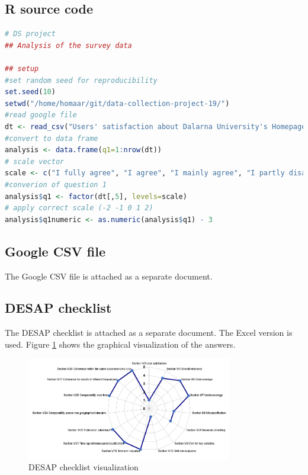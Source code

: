 \documentclass[12pt,a4paper,paper=a4,oneside,titlepage,pdftex]{scrartcl}
\begin{document}
\newpage
\subsection{R source code}
\begin{lstlisting}[caption={Data Import into R and first analysis steps},label={lst:r-import},language=R]
# DS project
## Analysis of the survey data

## setup
#set random seed for reproducibility
set.seed(10)
setwd("/home/homaar/git/data-collection-project-19/")
#read google file
dt <- read_csv("Users' satisfaction about Dalarna University's Homepage.csv")
#convert to data frame
analysis <- data.frame(q1=1:nrow(dt))
# scale vector
scale <- c("I fully agree", "I agree", "I mainly agree", "I partly disagree", "I disagree")
#converion of question 1
analysis$q1 <- factor(dt[,5], levels=scale)
# apply correct scale (-2 -1 0 1 2)
analysis$q1numeric <- as.numeric(analysis$q1) - 3
\end{lstlisting}

\subsection{Google CSV file}
The Google CSV file is attached as a separate document.

\subsection{DESAP checklist}
The DESAP checklist is attached as a separate document. The Excel version is used. Figure \ref{fig:desap} shows the graphical visualization of the answers.

\begin{figure}[h!]
    \centering
    \includegraphics[width=0.8\textwidth]{figures/desap-graph.PNG}
    \caption{DESAP checklist visualization}
    \label{fig:desap}
\end{figure}
\end{document}
